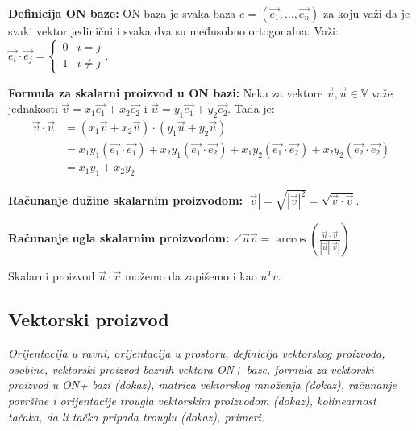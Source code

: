 \documentclass[12pt]{article}
\newcommand{\vek}[1]{\overrightarrow{#1}}
\begin{document}
\textbf{Definicija ON baze:} ON baza je svaka baza $e=(\vek{e_1},\dotsc,
    \vek{e_n})$ za koju važi da je svaki vektor jedinični i svaka dva su
međusobno ortogonalna. Važi: $\vek{e_i}\cdot\vek{e_j} =
    \begin{cases}
        0 & i=j     \\
        1 & i\neq j
    \end{cases}$.
\par

\textbf{Formula za skalarni proizvod u ON bazi:} Neka za vektore $\vek{v},
    \vek{u}\in\mathbb{V}$ važe jednakosti $\vek{v}=x_1\vek{e_1}+x_2\vek{e_2}$ i
$\vek{u}=y_1\vek{e_1}+y_2\vek{e_2}$. Tada je:
\begin{align*}
    \vek{v}\cdot\vek{u} & = (x_1\vek{v}+x_2\vek{v})\cdot(y_1\vek{u}
    +y_2\vek{u})                                                             \\
                        & = x_1y_1(\vek{e_1}\cdot\vek{e_1})+x_2y_1(\vek{e_1}
    \cdot\vek{e_2})+x_1y_2(\vek{e_1}\cdot\vek{e_2})+x_2y_2(\vek{e_2}
    \cdot\vek{e_2})                                                          \\
                        & = x_1y_1+x_2y_2
\end{align*}
\par

\textbf{Računanje dužine skalarnim proizvodom:} $|\vek{v}|=\sqrt{|\vek{v}|^2}=
    \sqrt{\vek{v}\cdot\vek{v}}$.
\par

\textbf{Računanje ugla skalarnim proizvodom:} $\angle{\vek{u}\vek{v}}=
    \arccos(\frac{\vek{u}\cdot\vek{v}}{|\vek{u}||\vek{v}|})$
\par

Skalarni proizvod $\vek{u}\cdot\vek{v}$ možemo da zapišemo i kao $u^Tv$.
\par

\subsection{Vektorski proizvod}
\textit{Orijentacija u ravni, orijentacija u prostoru, definicija vektorskog
    proizvoda, osobine, vektorski proizvod baznih vektora ON+ baze, formula za
    vektorski proizvod u ON+ bazi (dokaz), matrica vektorskog množenja (dokaz),
    računanje površine i orijentacije trougla vektorskim proizvodom (dokaz),
    kolinearnost tačaka, da li tačka pripada trouglu (dokaz), primeri.}
\par
\vspace*{1cm}
\end{document}
